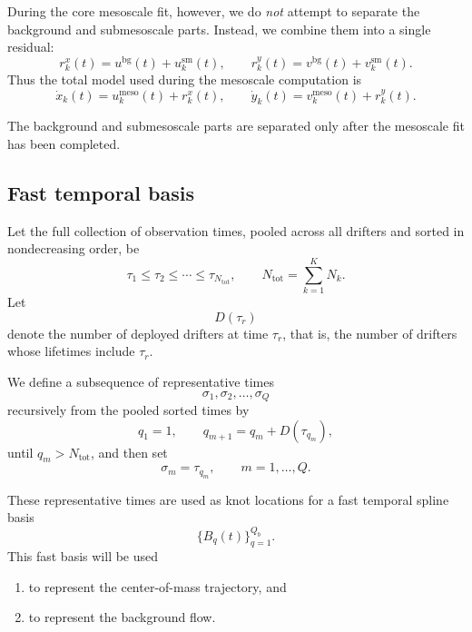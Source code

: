 During the core mesoscale fit, however, we do \emph{not} attempt to separate the background
and submesoscale parts. Instead, we combine them into a single residual:
\begin{equation}
r_k^x(t)=u^{\mathrm{bg}}(t)+u_k^{\mathrm{sm}}(t),
\qquad
r_k^y(t)=v^{\mathrm{bg}}(t)+v_k^{\mathrm{sm}}(t).
\label{eq:combined_residual}
\end{equation}
Thus the total model used during the mesoscale computation is
\begin{equation}
\dot{x}_k(t)=u_k^{\mathrm{meso}}(t)+r_k^x(t),
\qquad
\dot{y}_k(t)=v_k^{\mathrm{meso}}(t)+r_k^y(t).
\label{eq:core_total_model}
\end{equation}

The background and submesoscale parts are separated only after the mesoscale fit has been
completed.

\subsection{Fast temporal basis}

Let the full collection of observation times, pooled across all drifters and sorted in
nondecreasing order, be
\begin{equation}
\tau_1 \le \tau_2 \le \cdots \le \tau_{N_{\mathrm{tot}}},
\qquad
N_{\mathrm{tot}}=\sum_{k=1}^{K}N_k.
\end{equation}
Let
\begin{equation}
D(\tau_r)
\end{equation}
denote the number of deployed drifters at time $\tau_r$, that is, the number of drifters whose
lifetimes include $\tau_r$.

We define a subsequence of representative times
\begin{equation}
\sigma_1,\sigma_2,\dots,\sigma_Q
\end{equation}
recursively from the pooled sorted times by
\begin{equation}
q_1=1,
\qquad
q_{m+1}=q_m + D(\tau_{q_m}),
\label{eq:fast_stride_rule}
\end{equation}
until $q_m>N_{\mathrm{tot}}$, and then set
\begin{equation}
\sigma_m=\tau_{q_m}, \qquad m=1,\dots,Q.
\label{eq:fast_knot_times}
\end{equation}

These representative times are used as knot locations for a fast temporal spline basis
\begin{equation}
\{B_q(t)\}_{q=1}^{Q_b}.
\label{eq:fast_basis_def}
\end{equation}
This fast basis will be used
\begin{enumerate}
    \item to represent the center-of-mass trajectory, and
    \item to represent the background flow.
\end{enumerate}

